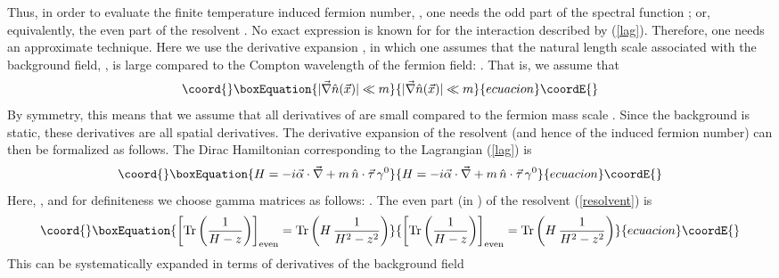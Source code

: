 \documentclass[a4paper,prd]{revtex4}
\begin{document}
Thus, in order to evaluate the finite temperature induced fermion
number,
\coordHE{}, one needs the odd part of the spectral function
\coordHE{}; or, equivalently, the even part of the resolvent \coordHE{}. No
exact expression is known for 
\coordHE{} for the interaction described by (\ref{lag}).
Therefore, one needs an approximate technique. Here we use the
derivative expansion \cite{ian}, in which one assumes that the natural
length scale \myHighlight{$\lambda$}\coordHE{} associated with the background field,
\coordHE{}, is large compared to the Compton wavelength
\coordHE{} of the fermion field: \coordHE{}. That is, we
assume that
\begin{equation}\coord{}\boxEquation{
|\vec{\nabla}\hat{n}(\vec{x})|\ll m
\label{deriv}
}{
|\vec{\nabla}\hat{n}(\vec{x})|\ll m
}{ecuacion}\coordE{}\end{equation}
By symmetry, this means that we assume that all derivatives of \coordHE{} are small
compared to the fermion mass scale \coordHE{}. Since the background is static,
these derivatives are all spatial derivatives. The derivative expansion
of the resolvent (and hence of the induced fermion number) can then be
formalized as follows. The Dirac Hamiltonian corresponding to the
Lagrangian (\ref{lag}) is
\begin{equation}\coord{}\boxEquation{
H=-i\vec{\alpha}\cdot \vec{\nabla}+m\, \hat{n}\cdot\vec{\tau}\,\gamma^{0}
\label{ham}
}{
H=-i\vec{\alpha}\cdot \vec{\nabla}+m\, \hat{n}\cdot\vec{\tau}\,\gamma^{0}
}{ecuacion}\coordE{}\end{equation}
Here, \coordHE{}, and for definiteness we choose gamma
matrices as follows: \coordHE{}. The even part (in \coordHE{}) of the resolvent (\ref{resolvent})
is
\begin{equation}\coord{}\boxEquation{
\left[\textrm{Tr}\left(\frac{1}{H-z}\right)\right]_{\rm
even}=\textrm{Tr}\left(H\,\frac{1}{H^{2}-z^{2}}\right)
\label{evenres}
}{
\left[\textrm{Tr}\left(\frac{1}{H-z}\right)\right]_{\rm
even}=\textrm{Tr}\left(H\,\frac{1}{H^{2}-z^{2}}\right)
}{ecuacion}\coordE{}\end{equation}
This can be systematically expanded in terms of derivatives of the background field
\end{document}
